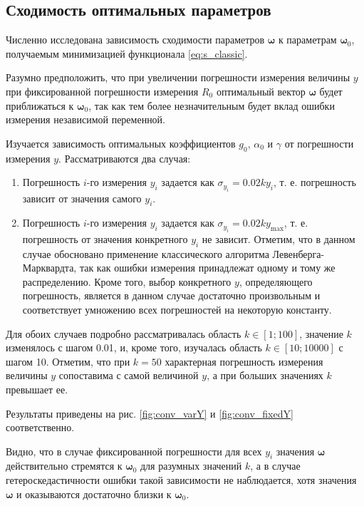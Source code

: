 \documentclass[11pt,a4paper]{article}
\begin{document}
\subsection{Сходимость оптимальных параметров}
Численно исследована зависимость сходимости параметров $\boldsymbol{\omega}$ к параметрам
$\boldsymbol{\omega}_0$, получаемым минимизацией функционала \eqref{eq:s_classic}.

Разумно предположить, что при увеличении погрешности измерения величины $y$ при
фиксированной погрешности измерения $R_0$ оптимальный вектор $\boldsymbol{\omega}$
будет приближаться к $\boldsymbol{\omega}_0$, так как тем более незначительным
будет вклад ошибки измерения независимой переменной.

Изучается зависимость оптимальных коэффициентов $g_0$, $\alpha_0$ и $\gamma$ от
погрешности измерения $y$. Рассматриваются два случая:
\begin{enumerate}
  \item Погрешность $i$-го измерения $y_i$ задается как $\sigma_{y_i} = 0.02ky_i$, т. е.
	погрешность зависит от значения самого $y_i$.
  \item Погрешность $i$-го измерения $y_i$ задается как $\sigma_{y_i} = 0.02ky_{\max}$,
	т. е. погрешность от значения конкретного $y_i$ не зависит. Отметим, что в данном
	случае обосновано применение классического алгоритма Левенберга-Марквардта, так как
	ошибки измерения принадлежат одному и тому же распределению. Кроме того, выбор
	конкретного $y$, определяющего погрешность, является в данном случае достаточно
	произвольным и соответствует умножению всех погрешностей на некоторую константу.
\end{enumerate}

Для обоих случаев подробно рассматривалась область $k \in [1; 100]$, значение $k$
изменялось с шагом 0.01, и, кроме того, изучалась область $k \in [10; 10000]$ с шагом 10.
Отметим, что при $k = 50$ характерная погрешность измерения величины $y$ сопоставима с самой
величиной $y$, а при больших значениях $k$ превышает ее.

Результаты приведены на рис. \ref{fig:conv_varY} и \ref{fig:conv_fixedY} соответственно.

Видно, что в случае фиксированной погрешности для всех $y_i$ значения $\boldsymbol{\omega}$
действительно стремятся к $\boldsymbol{\omega}_0$ для разумных значений $k$, а в случае
гетероскедастичности ошибки такой зависимости не наблюдается, хотя значения $\boldsymbol{\omega}$
и оказываются достаточно близки к $\boldsymbol{\omega}_0$.
\end{document}
